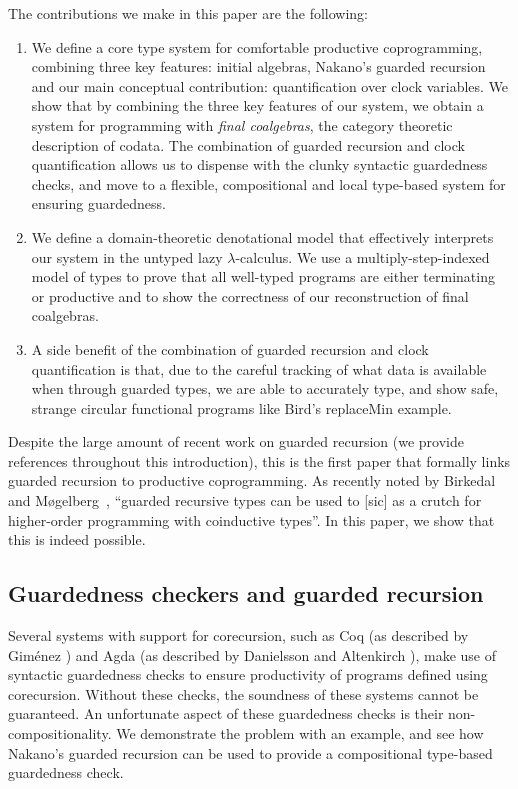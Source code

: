 \documentclass[natbib]{sigplanconf}
\begin{document}
The contributions we make in this paper are the following:
\begin{enumerate}
\item We define a core type system for comfortable productive
  coprogramming, combining three key features: initial algebras,
  Nakano's guarded recursion and our main conceptual contribution:
  quantification over clock variables. We show that by combining the
  three key features of our system, we obtain a system for programming
  with \emph{final coalgebras}, the category theoretic description of
  codata. The combination of guarded recursion and clock
  quantification allows us to dispense with the clunky syntactic
  guardedness checks, and move to a flexible, compositional and
  local type-based system for ensuring guardedness.
\item We define a domain-theoretic denotational model that effectively
  interprets our system in the untyped lazy $\lambda$-calculus. We use
  a multiply-step-indexed model of types to prove that all well-typed
  programs are either terminating or productive and to show the
  correctness of our reconstruction of final coalgebras.
\item A side benefit of the combination of guarded recursion and clock
  quantification is that, due to the careful tracking of what data is
  available when through guarded types, we are able to accurately
  type, and show safe, strange circular functional programs like
  Bird's replaceMin example.
\end{enumerate}

Despite the large amount of recent work on guarded recursion (we
provide references throughout this introduction), this is the first
paper that formally links guarded recursion to productive
coprogramming. As recently noted by Birkedal and
M{\o}gelberg~\cite{birkedal13intensional}, ``guarded recursive types
can be used to [sic] as a crutch for higher-order programming with
coinductive types''. In this paper, we show that this is indeed
possible.

\subsection{Guardedness checkers and guarded recursion}

Several systems with support for corecursion, such as Coq (as
described by Gim{\'e}nez \cite{gimenez94codifying}) and Agda (as
described by Danielsson and Altenkirch \cite{danielsson09mixing}),
make use of syntactic guardedness checks to ensure productivity of
programs defined using corecursion. Without these checks, the
soundness of these systems cannot be guaranteed. An unfortunate aspect
of these guardedness checks is their non-compositionality. We
demonstrate the problem with an example, and see how Nakano's guarded
recursion can be used to provide a compositional type-based
guardedness check.
\end{document}
